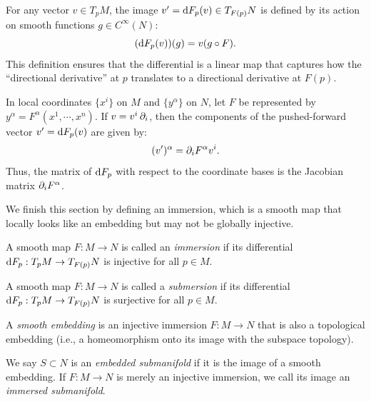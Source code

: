 
For any vector $v \in T_pM$, the image $v' = \dF_p(v) \in T_{F(p)}N$ is defined by its action on smooth functions $g \in C^\infty(N)$:
\[%
  (\dF_p(v))(g) = v(g \circ F)
.\]%
This definition ensures that the differential is a linear map that captures how the ``directional derivative'' at $p$ translates to a directional derivative at $F(p)$.

In local coordinates $\{x^i\}$ on $M$ and $\{y^\alpha\}$ on $N$, let $F$ be represented by $y^\alpha = F^\alpha(x^1, \cdots, x^n)$. If $v = v^i\pd{i}$, then the components of the pushed-forward vector $v' = \dF_p(v)$ are given by:
\[%
  (v')^\alpha = \pd{i}F^\alpha v^i
.\]%
Thus, the matrix of $\dF_p$ with respect to the coordinate bases is the Jacobian matrix $\pd{i}F^\alpha$.

We finish this section by defining an immersion, which is a smooth map that locally looks like an embedding but may not be globally injective.

\begin{definition}
  A smooth map $F : M \to N$ is called an \emph{immersion} if its differential $\dF_p : T_pM \to T_{F(p)}N$ is injective for all $p \in M$.
\end{definition}


\begin{definition}
  A smooth map $F : M \to N$ is called a \emph{submersion} if its differential $\dF_p : T_pM \to T_{F(p)}N$ is surjective for all $p \in M$.
\end{definition}


\begin{definition}
  A \emph{smooth embedding} is an injective immersion $F : M \to N$ that is also a topological embedding (i.e., a homeomorphism onto its image with the subspace topology).
\end{definition}


\begin{definition}
  We say $S \subset N$ is an \emph{embedded submanifold} if it is the image of a smooth embedding. If $F : M \to N$ is merely an injective immersion, we call its image an \emph{immersed submanifold}.
\end{definition}

